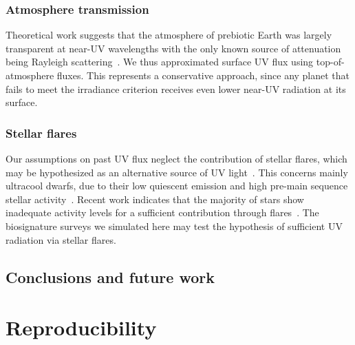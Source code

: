 \documentclass[modern,linenumbers]{aastex631}
\begin{document}
\subsubsection{Atmosphere transmission}
Theoretical work suggests that the atmosphere of prebiotic Earth was largely transparent at near-UV wavelengths with the only known source of attenuation being Rayleigh scattering~\citep{Ranjan2017,Ranjan2017c}.
We thus approximated surface UV flux using top-of-atmosphere fluxes.
This represents a conservative approach, since any planet that fails to meet the irradiance criterion receives even lower near-UV radiation at its surface. 

\subsubsection{Stellar flares}
Our assumptions on past UV flux neglect the contribution of stellar flares, which may be hypothesized as an alternative source of UV light~\citep{Ranjan2017}.
This concerns mainly ultracool dwarfs, due to their low quiescent emission and high pre-main sequence stellar activity~\citep{Buccino2007,West2008}.
Recent work indicates that the majority of stars show inadequate activity levels for a sufficient contribution through flares~\citep{Glazier2020,Ducrot2020,Günther2020}.
The biosignature surveys we simulated here may test the hypothesis of sufficient UV radiation via stellar flares.




\subsection{Conclusions and future work}

%

\section*{Reproducibility}


\end{document}
